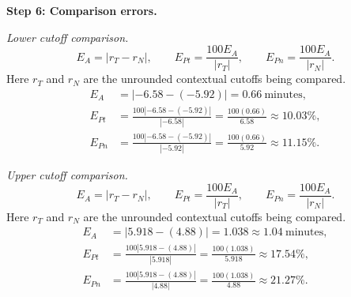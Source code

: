 \begin{enumerate}[leftmargin=*,label=\textbf{\arabic*.},itemsep=12pt,parsep=3pt,topsep=5pt]
\begin{minipage}{\linewidth}
\end{minipage}\par
\par\textbf{Step 6: Comparison errors.}\nopagebreak\enspace \par\noindent\begin{minipage}{\linewidth}
\par\textit{Lower cutoff comparison.}
\[
E_A=|r_T-r_N|,\qquad E_{Pt}=\frac{100E_A}{|r_T|},\qquad E_{Pn}=\frac{100E_A}{|r_N|}.
\]
Here $r_T$ and $r_N$ are the unrounded contextual cutoffs being compared.
\[
\begin{aligned}
E_A&=|-6.58-(-5.92)|=0.66\ \text{minutes},\\
E_{Pt}&=\frac{100|-6.58-(-5.92)|}{|-6.58|}=\frac{100(0.66)}{6.58}\approx 10.03\%,\\
E_{Pn}&=\frac{100|-6.58-(-5.92)|}{|-5.92|}=\frac{100(0.66)}{5.92}\approx 11.15\%.
\end{aligned}
\]
\end{minipage}\par
\par\noindent\begin{minipage}{\linewidth}
\par\textit{Upper cutoff comparison.}
\[
E_A=|r_T-r_N|,\qquad E_{Pt}=\frac{100E_A}{|r_T|},\qquad E_{Pn}=\frac{100E_A}{|r_N|}.
\]
Here $r_T$ and $r_N$ are the unrounded contextual cutoffs being compared.
\[
\begin{aligned}
E_A&=|5.918-(4.88)|=1.038\approx 1.04\ \text{minutes},\\
E_{Pt}&=\frac{100|5.918-(4.88)|}{|5.918|}=\frac{100(1.038)}{5.918}\approx 17.54\%,\\
E_{Pn}&=\frac{100|5.918-(4.88)|}{|4.88|}=\frac{100(1.038)}{4.88}\approx 21.27\%.
\end{aligned}
\]
\end{minipage}\par


\end{enumerate}

